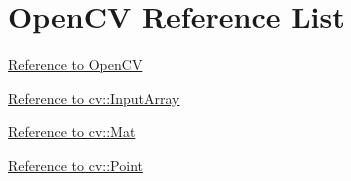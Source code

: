 \documentclass{scrreprt}
\begin{document}
\section{OpenCV Reference List}

\href{http://docs.opencv.org/3.1.0/}{Reference to OpenCV}

\href{http://docs.opencv.org/3.1.0/d4/d32/classcv_1_1__InputArray.html}{Reference to cv::InputArray}

\href{http://docs.opencv.org/3.1.0/d3/d63/classcv_1_1Mat.html#details}{Reference to cv::Mat}

\href{http://docs.opencv.org/3.1.0/db/d4e/classcv_1_1Point__.html}{Reference to cv::Point}
\end{document}
